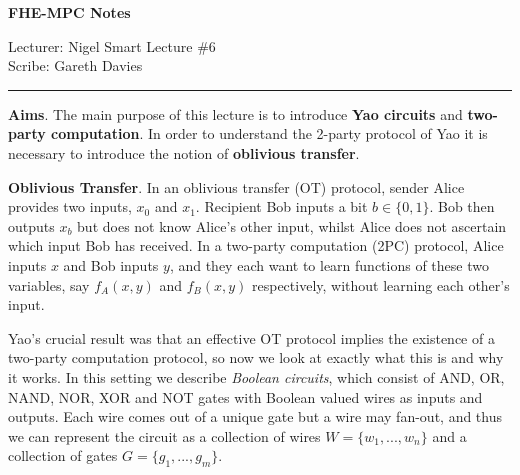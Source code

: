 \documentclass[11pt]{article}
\begin{document}
\thispagestyle{empty}


\begin{center}
\bf\large FHE-MPC Notes
\end{center}

\noindent
Lecturer: Nigel Smart               %
\hfill
Lecture \#6               %
\\
Scribe: Gareth Davies                 %
\hfill

\noindent
\rule{\textwidth}{1pt}

\medskip

\noindent \textbf{Aims}. The main purpose of this lecture is to introduce \textbf{Yao circuits} and \textbf{two-party computation}. In order to understand the 2-party protocol of Yao it is necessary to introduce the notion of \textbf{oblivious transfer}.
\medskip

\noindent \textbf{Oblivious Transfer}. In an oblivious transfer (OT) protocol, sender Alice provides two inputs, $x_0$ and $x_1$. Recipient Bob inputs a bit $b \in \{0,1\}$. Bob then outputs $x_b$ but does not know Alice's other input, whilst Alice does not ascertain which input Bob has received. In a two-party computation (2PC) protocol, Alice inputs $x$ and Bob inputs $y$, and they each want to learn functions of these two variables, say $f_A(x,y)$ and $f_B(x,y)$ respectively, without learning each other's input. 

Yao's crucial result was that an effective OT protocol implies the existence of a two-party computation protocol, so now we look at exactly what this is and why it works. In this setting we describe \emph{Boolean circuits}, which consist of AND, OR, NAND, NOR, XOR and NOT gates with Boolean valued wires as inputs and outputs. Each wire comes out of a unique gate but a wire may fan-out, and thus we can represent the circuit as a collection of wires $W = \{w_1,...,w_n\}$ and a collection of gates $G = \{g_1,...,g_m\}$.
\medskip
\end{document}
